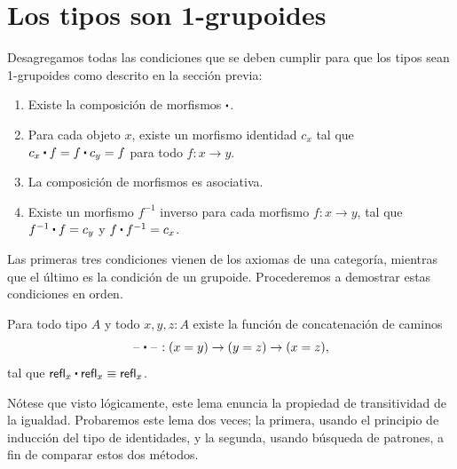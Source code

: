 \documentclass[../main.tex]{subfiles}
\begin{document}
\section{Los tipos son 1-grupoides}
Desagregamos todas las condiciones que se deben cumplir para que los tipos sean 1-grupoides como descrito en la secci\'on previa:

\begin{enumerate}
  \item Existe la composición de morfismos $\ct$.
  \item Para cada objeto $x$, existe un morfismo identidad $c_x$ tal que $c_x \ct f = f \ct c_y = f$ para todo $f:x \to y$.
  \item La composición de morfismos es asociativa.
  \item Existe un morfismo $f^{-1}$ inverso para cada morfismo $f:x \to y$, tal que $f^{-1} \ct f=c_y$ y $f \ct f^{-1}=c_x$.
\end{enumerate}

Las primeras tres condiciones vienen de los axiomas de una categor\'ia, mientras que el \'ultimo es la condici\'on de un grupoide. Procederemos a demostrar estas condiciones en orden.

\begin{lemma}
  Para todo tipo $A$ y todo $x,y,z:A$ existe la función de concatenaci\'on de caminos
  \begin{equation*}
    {\blank} \ct {\blank} : (x= y) \to (y= z) \to (x=  z),
  \end{equation*}
  tal que $\refl{x}\ct \refl{x}\jdeq \refl{x}$.
\end{lemma}

N\'otese que visto l\'ogicamente, este lema enuncia la propiedad de transitividad de la igualdad.
Probaremos este lema dos veces; la primera, usando el principio de inducci\'on del tipo de identidades, y la segunda, usando b\'usqueda de patrones, a fin de comparar estos dos m\'etodos.
\end{document}
